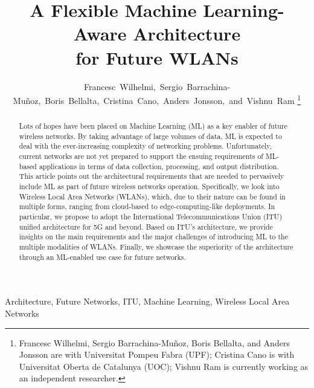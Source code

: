 \documentclass[journal]{IEEEtran}
\begin{document}
\title{A Flexible Machine Learning-Aware Architecture\\ for Future WLANs}

\author{Francesc~Wilhelmi,~Sergio~Barrachina-Mu\~noz,~Boris~Bellalta,~Cristina~Cano,~Anders~Jonsson,~and~Vishnu~Ram%
\thanks{Francesc Wilhelmi, Sergio Barrachina-Mu\~noz, Boris Bellalta, and Anders Jonsson are with Universitat Pompeu Fabra (UPF); Cristina Cano is with Universitat Oberta de Catalunya (UOC); Vishnu Ram is currently working as an independent researcher.}%
}

\maketitle

\begin{abstract}
Lots of hopes have been placed on Machine Learning (ML) as a key enabler of future wireless networks. By taking advantage of large volumes of data, ML is expected to deal with the ever-increasing complexity of networking problems. Unfortunately, current networks are not yet prepared to support the ensuing requirements of ML-based applications in terms of data collection, processing, and output distribution. This article points out the architectural requirements that are needed to pervasively include ML as part of future wireless networks operation. Specifically, we look into Wireless Local Area Networks (WLANs), which, due to their nature can be found in multiple forms, ranging from cloud-based to edge-computing-like deployments. In particular, we propose to adopt the International Telecommunications Union (ITU) unified architecture for 5G and beyond. Based on ITU's architecture, we provide insights on the main requirements and the major challenges of introducing ML to the multiple modalities of WLANs. Finally, we showcase the superiority of the architecture through an ML-enabled use case for future networks.
\end{abstract}

\begin{IEEEkeywords}
Architecture, Future Networks, ITU, Machine Learning, Wireless Local Area Networks
\end{IEEEkeywords}

\IEEEpeerreviewmaketitle
\end{document}
